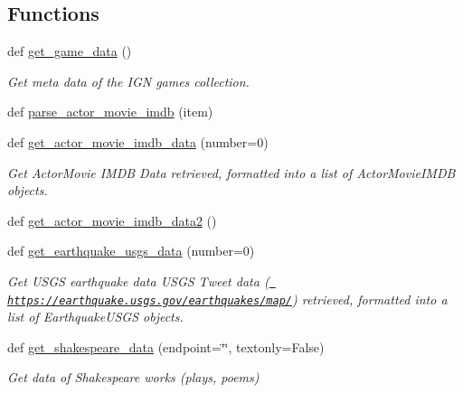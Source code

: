 \subsection*{Functions}
\begin{DoxyCompactItemize}
\item 
def \mbox{\hyperlink{namespacebridges_1_1data__src__dependent_1_1data__source_a31b64b8c7a42cdfca0a5f0ae3da187d2}{get\+\_\+game\+\_\+data}} ()
\begin{DoxyCompactList}\small\item\em Get meta data of the I\+GN games collection. \end{DoxyCompactList}\item 
def \mbox{\hyperlink{namespacebridges_1_1data__src__dependent_1_1data__source_adcd1eb0d5e4c80095232e808f34469ad}{parse\+\_\+actor\+\_\+movie\+\_\+imdb}} (item)
\item 
def \mbox{\hyperlink{namespacebridges_1_1data__src__dependent_1_1data__source_a5a685fd00b37b99d63e706289dad9063}{get\+\_\+actor\+\_\+movie\+\_\+imdb\+\_\+data}} (number=0)
\begin{DoxyCompactList}\small\item\em Get Actor\+Movie I\+M\+DB Data retrieved, formatted into a list of Actor\+Movie\+I\+M\+DB objects. \end{DoxyCompactList}\item 
def \mbox{\hyperlink{namespacebridges_1_1data__src__dependent_1_1data__source_a279aa1a757f4838f3d048651cb1a7d26}{get\+\_\+actor\+\_\+movie\+\_\+imdb\+\_\+data2}} ()
\item 
def \mbox{\hyperlink{namespacebridges_1_1data__src__dependent_1_1data__source_a0d2a8b28fa0fa79440112d02ca9cd7fc}{get\+\_\+earthquake\+\_\+usgs\+\_\+data}} (number=0)
\begin{DoxyCompactList}\small\item\em Get U\+S\+GS earthquake data U\+S\+GS Tweet data (\href{https://earthquake.usgs.gov/earthquakes/map/}{\texttt{ https\+://earthquake.\+usgs.\+gov/earthquakes/map/}}) retrieved, formatted into a list of Earthquake\+U\+S\+GS objects. \end{DoxyCompactList}\item 
def \mbox{\hyperlink{namespacebridges_1_1data__src__dependent_1_1data__source_a141593343ceef42e35072b3151a8b2db}{get\+\_\+shakespeare\+\_\+data}} (endpoint=\char`\"{}\char`\"{}, textonly=False)
\begin{DoxyCompactList}\small\item\em Get data of Shakespeare works (plays, poems) \end{DoxyCompactList}\item 

\end{DoxyCompactItemize}
